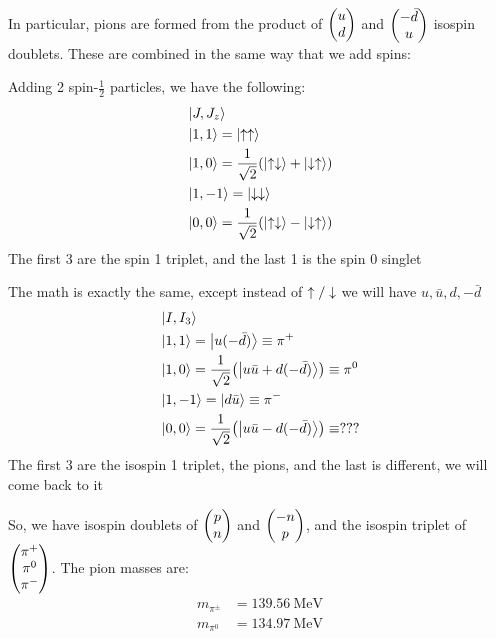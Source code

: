 In particular, pions are formed from the product of $\pmqty{u\\d}$ and $\pmqty{-\bar{d}\\u}$ isospin doublets. These are combined in the same way that we add spins:
\begin{example}
  Adding 2 spin-$\frac12$ particles, we have the following:
  \begin{align*}
    &\ket{J,J_z}\\
    &\ket{1, 1}=\ket{\uparrow\uparrow}\\
    &\ket{1, 0}
    =\frac1{\sqrt{2}}\qty(\ket{\uparrow\downarrow}+\ket{\downarrow\uparrow})\\
    &\ket{1,-1}=\ket{\downarrow\downarrow}\\
    &\ket{0,0}
    =\frac1{\sqrt{2}}\qty(\ket{\uparrow\downarrow}-\ket{\downarrow\uparrow})
  \end{align*}
  The first 3 are the spin 1 triplet, and the last 1 is the spin 0 singlet
\end{example}
\begin{example}
  The math is exactly the same, except instead of $\uparrow/\downarrow$ we will have $u,\bar{u},d,-\bar{d}$
  \begin{align*}
    &\ket{I,I_3}\\
    &\ket{1, 1}=\ket{u(-\bar{d})}\equiv\pi^+\\
    &\ket{1, 0}=\frac1{\sqrt{2}}\qty(\ket{u\bar{u}+d(-\bar{d})})\equiv\pi^0\\
    &\ket{1,-1}=\ket{d\bar{u}}\equiv\pi^-\\
    &\ket{0,0}=\frac1{\sqrt{2}}\qty(\ket{u\bar{u}-d(-\bar{d})})\equiv???
  \end{align*}
  The first 3 are the isospin 1 triplet, the pions, and the last is different, we will come back to it
\end{example}
So, we have isospin doublets of $\pmqty{p\\n}$ and $\pmqty{-n\\p}$, and the isospin triplet of $\pmqty{\pi^+\\\pi^0\\\pi^-}$. The pion masses are:
\begin{align*}
  m_{\pi^\pm}&=\SI{139.56}{\mega\eV}\\
  m_{\pi^0}&=\SI{134.97}{\mega\eV}
\end{align*}
